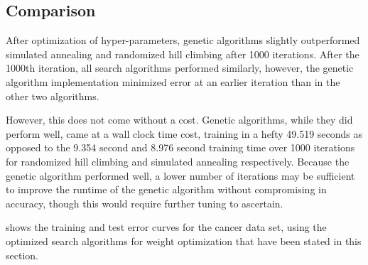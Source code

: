 \documentclass{article}
\begin{document}
    \subsection{Comparison}
      After optimization of hyper-parameters, genetic algorithms slightly outperformed simulated annealing and randomized hill climbing after 1000 iterations. After the 1000th iteration, all search algorithms performed similarly, however, the genetic algorithm implementation minimized error at an earlier iteration than in the other two algorithms.

      However, this does not come without a cost. Genetic algorithms, while they did perform well, came at a wall clock time cost, training in a hefty 49.519 seconds as opposed to the 9.354 second and 8.976 second training time over 1000 iterations for randomized hill climbing and simulated annealing respectively. Because the genetic algorithm performed well, a lower number of iterations may be sufficient to improve the runtime of the genetic algorithm without compromising in accuracy, though this would require further tuning to ascertain.

       shows the training and test error curves for the cancer data set, using the optimized search algorithms for weight optimization that have been stated in this section.
\end{document}
